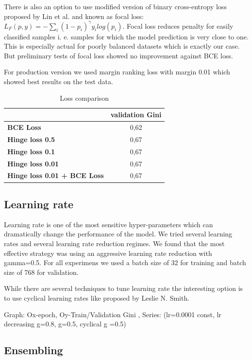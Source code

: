 \documentclass{sigkddExp}
\begin{document}
There is also an option to use modified version of binary cross-entropy loss proposed by Lin et al.\cite{DBLP:journals/corr/abs-1708-02002} and known as focal loss: $L_F(p, y) = -\sum_i (1 - p_i)^\gamma y_i log(p_i)$. Focal loss reduces penalty for easily classified samples i. e. samples for which the model prediction is very close to one. This is especially actual for poorly balanced datasets which is exactly our case. But preliminary tests of focal loss showed no improvement against BCE loss.

For production version we used margin ranking loss with margin 0.01 which showed best results on the test data. 

\begin{table}
\caption{Loss comparison}
\begin{tabular}{ | l | c |  }
\hline
& \textbf{validation Gini} \\
\hline
\textbf{BCE Loss} & 0,62  \\
\textbf{Hinge loss 0.5} & 0,67  \\
\textbf{Hinge loss 0.1} & 0,67  \\
\textbf{Hinge loss 0.01} & 0,67  \\
\textbf{Hinge loss 0.01 + BCE Loss} & 0,67  \\
\hline
\end{tabular}
\label{tab4}
\end{table}

\subsection{Learning rate}

Learning rate is one of the most sensitive hyper-parameters which can dramatically change the performance of the model. We tried several learning rates and several learning rate reduction regimes. We found that the most effective strategy was using an aggressive learning rate reduction with gamma=0.5.
For all experimens we used a batch size of 32 for training and batch size of 768 for validation.

While there are several techniques to tune learning rate the interesting option is to use cyclical learning rates like proposed by Leslie N. Smith.\cite{DBLP:journals/corr/Smith15a}

Graph: Ox-epoch, Oy-Train/Validation Gini , Series: (lr=0.0001 const, lr decreasing g=0.8, g=0.5, cyclical g =0.5) 


\subsection{Ensembling}
\end{document}
